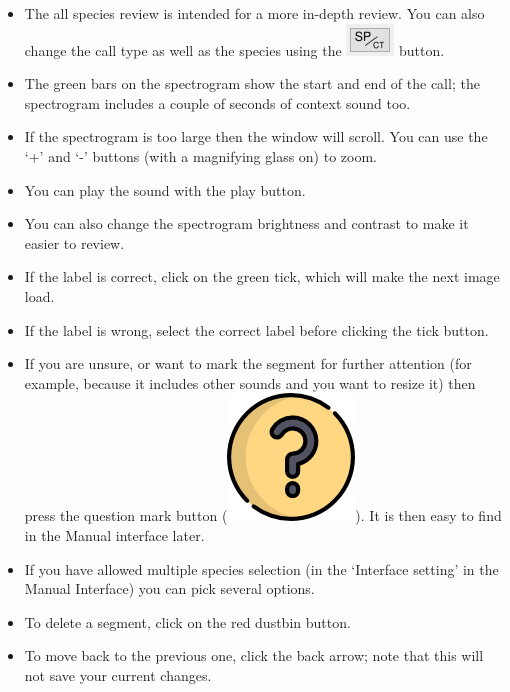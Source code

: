 \documentclass{article}
\begin{document}
\begin{itemize}
\item The all species review is intended for a more in-depth review. You can also change the call type as well as the species using the \includegraphics[scale=0.5]{Figures/SPCT} button.
\item The green bars on the spectrogram show the start and end of the call; the spectrogram includes a couple of seconds of context sound too. 
\item If the spectrogram is too large then the window will scroll. You can use the `+' and `-' buttons (with a magnifying glass on) to zoom. 
\item You can play the sound with the play button. 
\item You can also change the spectrogram brightness and contrast to make it easier to review. 
\item If the label is correct, click on the green tick, which will make the next image load. 
\item If the label is wrong, select the correct label before clicking the tick button. 
\item If you are unsure, or want to mark the segment for further attention (for example, because it includes other sounds and you want to resize it) then press the question mark button (\includegraphics[scale=0.03]{Figures/questionL}). It is then easy to find in the Manual interface later.
\item If you have allowed multiple species selection (in the `Interface setting' in the Manual Interface) you can pick several options. 
\item To delete a segment, click on the red dustbin button. 
\item To move back to the previous one, click the back arrow; note that this will not save your current changes. 
\end{itemize}

\end{document}
